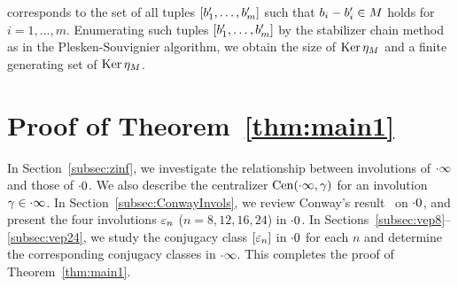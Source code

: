 \documentclass{amsart} %
\begin{document}
corresponds to the set of 
all tuples $[b_1^{\prime}, \dots, b_{m}^{\prime}]$
such that $b_i-b_i^{\prime}\in M$ holds for $i=1, \dots, m$.
Enumerating such tuples $[b_1^{\prime}, \dots, b_{m}^{\prime}]$
by the stabilizer chain method as in the Plesken-Souvignier algorithm, 
we obtain the size of $\operatorname{Ker} \eta_M$
and a finite generating set of $\operatorname{Ker} \eta_M$.
%
%
%
\section{Proof of Theorem~\ref{thm:main1}}\label{sec:proofofmain1}
%
In Section~\ref{subsec:zinf}, 
we investigate the relationship between involutions of $\cdot \infty$ and those of $\cdot 0$.
We also describe the centralizer $\mathrm{Cen}(\cdot \infty, \gamma)$
for an involution $\gamma\in \cdot \infty$.
In Section~\ref{subsec:ConwayInvols}, 
we review Conway's result~\cite[Chapter 10]{theCSbook} on $\cdot 0$, 
and present the four involutions $\varepsilon_n$ ($n=8,12,16,24$) 
 in $\cdot 0$.
In Sections~\ref{subsec:vep8}--\ref{subsec:vep24}, 
we study the conjugacy class $[\varepsilon_n]$ in $\cdot 0$ for each $n$ 
and determine the corresponding conjugacy classes in $\cdot \infty$. This completes the proof of Theorem~\ref{thm:main1}.
%
%
\end{document}
